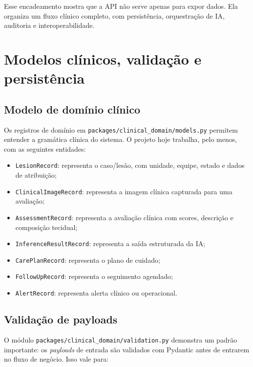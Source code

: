 \documentclass[
    12pt,
    openright,
    oneside,
    a4paper,
    chapter=TITLE,
    section=TITLE,
    brazil,
    sumario=tradicional,
    hidelinks
]{abntex2}
\begin{document}
Esse encadeamento mostra que a API n\~ao serve apenas para expor dados. Ela organiza um fluxo cl\'inico completo, com persist\^encia, orquestra\c{c}\~ao de IA, auditoria e interoperabilidade.

\chapter{Modelos cl\'inicos, valida\c{c}\~ao e persist\^encia}

\section{Modelo de dom\'inio cl\'inico}

Os registros de dom\'inio em \texttt{packages/clinical\_domain/models.py} permitem entender a gram\'atica cl\'inica do sistema. O projeto hoje trabalha, pelo menos, com as seguintes entidades:

\begin{itemize}
    \item \texttt{LesionRecord}: representa o caso/les\~ao, com unidade, equipe, estado e dados de atribui\c{c}\~ao;
    \item \texttt{ClinicalImageRecord}: representa a imagem cl\'inica capturada para uma avalia\c{c}\~ao;
    \item \texttt{AssessmentRecord}: representa a avalia\c{c}\~ao cl\'inica com scores, descri\c{c}\~ao e composi\c{c}\~ao tecidual;
    \item \texttt{InferenceResultRecord}: representa a sa\'ida estruturada da IA;
    \item \texttt{CarePlanRecord}: representa o plano de cuidado;
    \item \texttt{FollowUpRecord}: representa o seguimento agendado;
    \item \texttt{AlertRecord}: representa alerta cl\'inico ou operacional.
\end{itemize}

\section{Valida\c{c}\~ao de payloads}

O m\'odulo \texttt{packages/clinical\_domain/validation.py} demonstra um padr\~ao importante: os \textit{payloads} de entrada s\~ao validados com Pydantic antes de entrarem no fluxo de neg\'ocio. Isso vale para:
\end{document}
